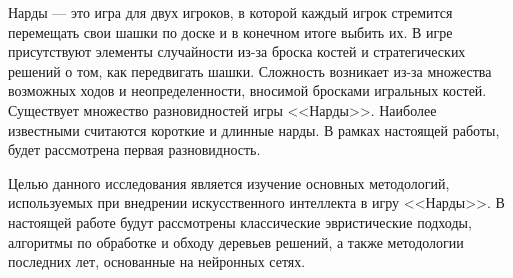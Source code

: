 Нарды --- это игра для двух игроков, в которой каждый игрок стремится перемещать свои шашки по доске и в конечном итоге выбить их. В игре присутствуют элементы случайности из-за броска костей и стратегических решений о том, как передвигать шашки. Сложность возникает из-за множества возможных ходов и неопределенности, вносимой бросками игральных костей. Существует множество разновидностей игры <<Нарды>>. Наиболее известными считаются короткие и длинные нарды. В рамках настоящей работы, будет рассмотрена первая разновидность.

Целью данного исследования является изучение основных методологий, используемых при внедрении искусственного интеллекта в игру <<Нарды>>. В настоящей работе будут рассмотрены классические эвристические подходы, алгоритмы по обработке и обходу деревьев решений, а также методологии последних лет, основанные на нейронных сетях.
